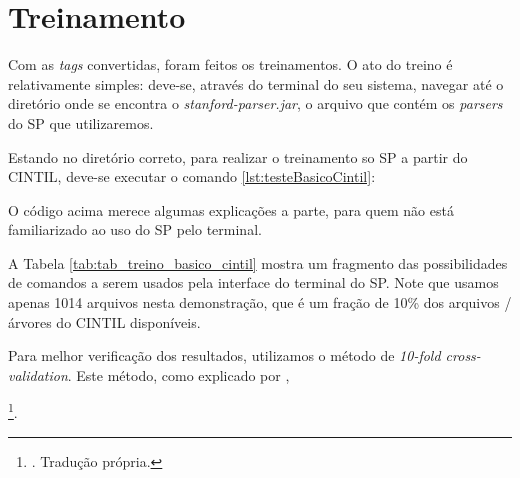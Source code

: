 \section{Treinamento}
\label{sec:desenvolvimento_treinamento_}


Com as \textit{tags} convertidas, foram feitos os treinamentos. O ato do treino é relativamente simples: deve-se, através do terminal do seu sistema, navegar até o diretório onde se encontra o \textit{stanford-parser.jar}, o arquivo que contém os \textit{parsers} do SP que utilizaremos. 

Estando no diretório correto, para realizar o treinamento so SP a partir do CINTIL, deve-se executar o comando \ref{lst:testeBasicoCintil}:

\begin{center}
    
\end{center}

O código acima merece algumas explicações a parte, para quem não está familiarizado ao uso do SP pelo terminal.

\begin{center}
    
\end{center}

A Tabela \ref{tab:tab_treino_basico_cintil} mostra um fragmento das possibilidades de comandos a serem usados pela interface do terminal do SP. Note que usamos apenas 1014 arquivos nesta demonstração, que é um fração de 10\% dos arquivos / árvores do CINTIL disponíveis.

Para melhor verificação dos resultados, utilizamos o método de \textit{10-fold cross-validation}. Este método, como explicado por ,
\begin{displayquote}
    \footnote{. Tradução própria.}.
\end{displayquote}

